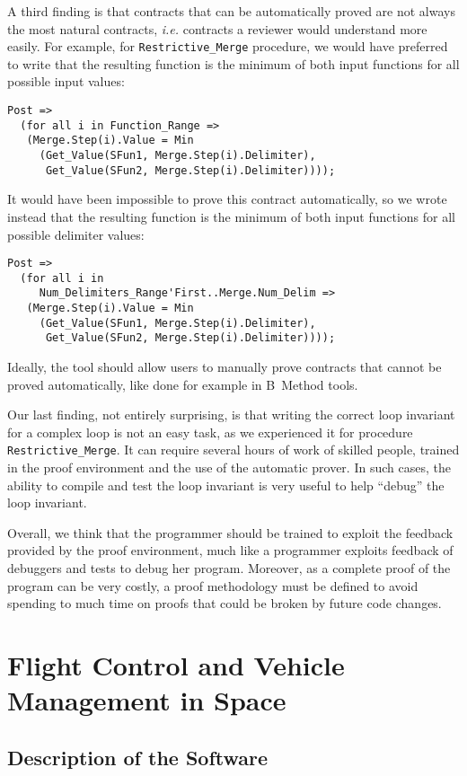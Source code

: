 \documentclass[10pt,a4paper,twocolumn]{article}
\newcommand{\ie}{\textit{i.e.}\xspace}
\newcommand{\SPARK}[1]{\lstinline[language=Ada,basicstyle={\footnotesize
      \sffamily},framesep=0pt]$#1$}
\begin{document}
A third finding is that contracts that can be automatically proved are
not always the most natural contracts, \ie contracts a reviewer would
understand more easily. For example, for \SPARK{Restrictive_Merge}
procedure, we would have preferred to write that the resulting function
is the minimum of both input functions for all possible input
values:
\begin{lstlisting}
Post =>
  (for all i in Function_Range =>
   (Merge.Step(i).Value = Min
     (Get_Value(SFun1, Merge.Step(i).Delimiter),
      Get_Value(SFun2, Merge.Step(i).Delimiter))));
\end{lstlisting}
It would have been impossible to prove this contract automatically, so we wrote
instead that the resulting function is the minimum of both input functions for
all possible delimiter values:
\begin{lstlisting}
Post =>
  (for all i in
     Num_Delimiters_Range'First..Merge.Num_Delim =>
   (Merge.Step(i).Value = Min
     (Get_Value(SFun1, Merge.Step(i).Delimiter),
      Get_Value(SFun2, Merge.Step(i).Delimiter))));
\end{lstlisting}
Ideally, the tool should allow users to manually prove contracts that cannot be
proved automatically, like done for example in B~Method tools.

Our last finding, not entirely surprising, is that writing the correct
loop invariant for a complex loop is not an easy task, as we experienced
it for procedure \SPARK{Restrictive_Merge}. It can require several
hours of work of skilled people, trained in the proof environment and
the use of the automatic prover. In such cases, the ability to
compile and test the loop invariant is very useful to help ``debug''
the loop invariant.

Overall, we think that the programmer should be trained to exploit the
feedback provided by the proof environment, much like a programmer
exploits feedback of debuggers and tests to debug her program.
Moreover, as a complete proof of the program can be very costly, a proof
methodology must be defined to avoid spending to much time on proofs
that could be broken by future code changes.

\section{Flight Control and Vehicle Management in Space}
\label{sec:space}

\subsection{Description of the Software}
\end{document}
